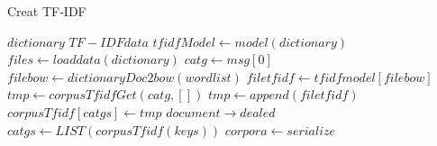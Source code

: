\label{alg:Creattfidf}
\renewcommand{\algorithmicrequire}{\textbf{input:}}
\renewcommand{\algorithmicensure}{\textbf{output:}}

\begin{algorithm}
  \caption{Creat TF-IDF}
    \begin{algorithmic}[1]
        \Require $dictionary$
        \Ensure  $TF-IDF data$
            \State $tfidfModel \gets model(dictionary)$
            \State $files \gets loaddata(dictionary)$
            \State {}
                      \State{}
                              \State $catg \gets msg[0]$
                              \State $filebow \gets dictionaryDoc2bow(wordlist)$
                              \State $filetfidf  \gets tfidfmodel[filebow]$
                              \State $tmp \gets corpusTfidfGet(catg,[])$
                              \State $tmp \gets append(filetfidf)$
                              \State {}
                                        \State $corpusTfidf[catgs] \gets tmp$
                      \State {}
                                        \State $document \to dealed$
            \State$catgs \gets LIST(corpusTfidf(keys))$
            \State {}
                          \State  $corpora \gets serialize $
            			\State{}
            \State{}
        \EndFunction
    \end{algorithmic}
\end{algorithm}
